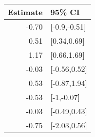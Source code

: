 \begin{tabular}{rl}
  \hline
Estimate & 95\% CI \\ 
  \hline
-0.70 & [-0.9,-0.51] \\ 
  0.51 & [0.34,0.69] \\ 
  1.17 & [0.66,1.69] \\ 
  -0.03 & [-0.56,0.52] \\ 
  0.53 & [-0.87,1.94] \\ 
  -0.53 & [-1,-0.07] \\ 
  -0.03 & [-0.49,0.43] \\ 
  -0.75 & [-2.03,0.56] \\ 
   \hline
\end{tabular}

